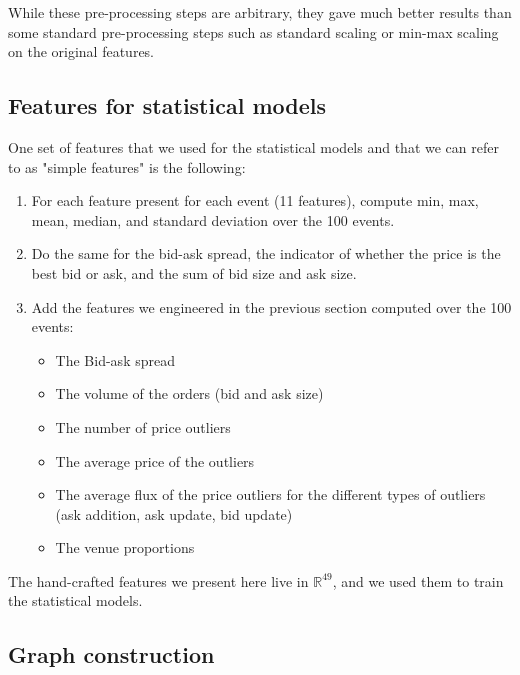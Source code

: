 \documentclass[switch, 11pt]{article}
\newcommand{\R}{\mathbb{R}}
\begin{document}
\begin{multicols}{2}

    While these pre-processing steps are arbitrary, they gave much better results than some standard pre-processing steps such as standard scaling or min-max scaling on the original features.

    \subsection{Features for statistical models}

    One set of features that we used for the statistical models and that we can refer to as "simple features" is the following:
    \begin{enumerate}
        \item For each feature present for each event (11 features), compute min, max, mean, median, and standard deviation over the 100 events.
        \item Do the same for the bid-ask spread, the indicator of whether the price is the best bid or ask, and the sum of bid size and ask size.
        \item Add the features we engineered in the previous section computed over the 100 events:
              \begin{itemize}
                  \item The Bid-ask spread
                  \item The volume of the orders (bid and ask size)
                  \item The number of price outliers
                  \item The average price of the outliers
                  \item The average flux of the price outliers for the different types of outliers (ask addition, ask update, bid update)
                  \item The venue proportions
              \end{itemize}
    \end{enumerate}
    The hand-crafted features we present here live in $\R^{49}$, and we used them to train the statistical models.

    \subsection{Graph construction}


\end{multicols}
\end{document}
